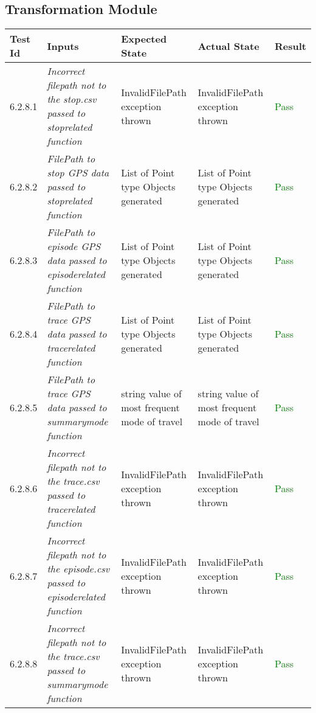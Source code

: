 \documentclass[12pt, titlepage]{article}
\begin{document}
\subsection{Transformation Module}
\begin{tabular}[H]{ | m{3.5em} | m{4cm}| m{4cm} | m{4cm} | m{1.2cm} | }
  \hline
  \textbf{Test Id}& \textbf{Inputs} & \textbf{Expected State} & \textbf{Actual State} & \textbf{Result} \\ 
  \hline
  6.2.8.1 & \textit{Incorrect filepath not to the stop.csv passed to stoprelated function} & InvalidFilePath exception thrown& InvalidFilePath exception thrown & \textcolor{green}{Pass} \\ 
  \hline

    6.2.8.2 & \textit{FilePath to stop GPS data passed to stoprelated function} & List of Point type Objects generated& List of Point type Objects generated& \textcolor{green}{Pass} \\ 
  \hline

  6.2.8.3 & \textit{FilePath to episode GPS data passed to episoderelated function} & List of Point type Objects generated& List of Point type Objects generated& \textcolor{green}{Pass} \\ 
  \hline

  6.2.8.4 & \textit{FilePath to trace GPS data passed to tracerelated function} & List of Point type Objects generated& List of Point type Objects generated& \textcolor{green}{Pass} \\ 
  \hline

  6.2.8.5 & \textit{FilePath to trace GPS data passed to summarymode function} & string value of most frequent mode of travel&  string value of most frequent mode of travel& \textcolor{green}{Pass} \\ 
  \hline

    6.2.8.6 & \textit{Incorrect filepath not to the trace.csv passed to tracerelated function} & InvalidFilePath exception thrown& InvalidFilePath exception thrown & \textcolor{green}{Pass} \\ 
  \hline
 6.2.8.7 & \textit{Incorrect filepath not to the episode.csv passed to episoderelated function} & InvalidFilePath exception thrown& InvalidFilePath exception thrown & \textcolor{green}{Pass} \\ 
  \hline

   6.2.8.8 & \textit{Incorrect filepath not to the trace.csv passed to summarymode function} & InvalidFilePath exception thrown& InvalidFilePath exception thrown & \textcolor{green}{Pass} \\ 
  \hline


\end{tabular}
\end{document}

